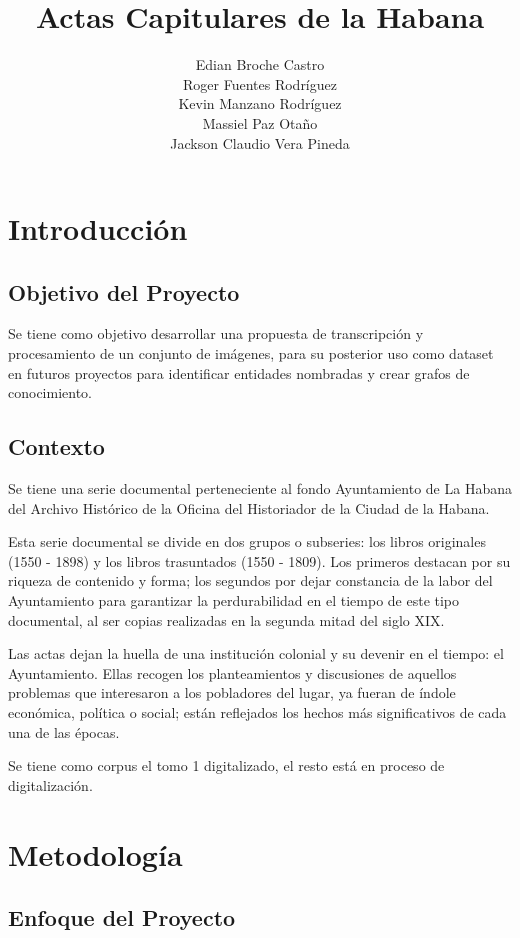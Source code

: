 \documentclass[11pt,a4paper]{article}
\title{Actas Capitulares de la Habana} \author{Edian Broche Castro \\ Roger Fuentes Rodr\'iguez \\ Kevin Manzano Rodr\'iguez \\ Massiel Paz Otaño \\ Jackson Claudio Vera Pineda} \date{}
\begin{document}
\maketitle

\tableofcontents

\section{Introducción}
\subsection{Objetivo del Proyecto} 

Se tiene como objetivo desarrollar una propuesta de transcripción y procesamiento de un conjunto de imágenes, para su posterior uso como dataset en futuros proyectos para identificar entidades nombradas y crear grafos de conocimiento.  

\subsection{Contexto}

Se tiene una serie documental perteneciente al fondo Ayuntamiento de La Habana del Archivo Histórico de la Oficina del Historiador de la Ciudad de la Habana.

Esta serie documental se divide en dos grupos o subseries: los libros originales (1550 - 1898) y los libros trasuntados (1550 - 1809). Los primeros destacan por su riqueza de contenido y forma; los segundos por dejar constancia de la labor del Ayuntamiento para garantizar la perdurabilidad en el tiempo de este tipo documental, al ser copias realizadas en la segunda mitad del siglo XIX.

Las actas dejan la huella de una institución colonial y su devenir en el tiempo: el Ayuntamiento. Ellas recogen los planteamientos y discusiones de aquellos problemas que interesaron a los pobladores del lugar, ya fueran de índole económica, política o social; están reflejados los hechos más significativos de cada una de las épocas.

Se tiene como corpus el tomo 1 digitalizado, el resto está en proceso de digitalización.

\section{Metodología} 
\subsection{Enfoque del Proyecto} 
\end{document}
